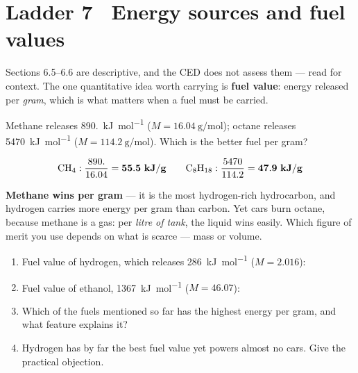\documentclass{apchem-worksheet}
\begin{document}
\section*{\sffamily Ladder 7 \textbullet\ Energy sources and fuel values}

Sections 6.5--6.6 are descriptive, and the CED does not assess them ---
read for context. The one quantitative idea worth carrying is
\textbf{fuel value}: energy released per \emph{gram}, which is what
matters when a fuel must be carried.

\begin{workedexample}
Methane releases \SI{890.}{\kilo\joule\per\mole}
($M = \SI{16.04}{\gram\per\mole}$); octane releases
\SI{5470}{\kilo\joule\per\mole} ($M = \SI{114.2}{\gram\per\mole}$).
Which is the better fuel per gram?

\[ \ce{CH4}: \frac{890.}{16.04} = \mathbf{55.5~kJ/g} \qquad
   \ce{C8H18}: \frac{5470}{114.2} = \mathbf{47.9~kJ/g} \]

\textbf{Methane wins per gram} --- it is the most hydrogen-rich
hydrocarbon, and hydrogen carries more energy per gram than carbon. Yet
cars burn octane, because methane is a gas: per \emph{litre of tank},
the liquid wins easily. Which figure of merit you use depends on what is
scarce --- mass or volume.
\end{workedexample}

\begin{yourturn}
\begin{enumerate}[leftmargin=*,itemsep=0.5em]
  \item Fuel value of hydrogen, which releases
        \SI{286}{\kilo\joule\per\mole} ($M = 2.016$):
        \workspace[1.6cm]
  \item Fuel value of ethanol, \SI{1367}{\kilo\joule\per\mole}
        ($M = 46.07$): \workspace[1.6cm]
  \item Which of the fuels mentioned so far has the highest energy per
        gram, and what feature explains it? \workspace[1.6cm]
  \item Hydrogen has by far the best fuel value yet powers almost no
        cars. Give the practical objection. \workspace[1.6cm]
\end{enumerate}
\end{yourturn}
\end{document}
